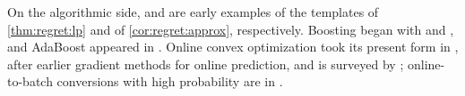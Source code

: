 \begin{refsection}
On the algorithmic side, \textcite{PlotkinShmoysTardos1995} and \textcite{GrigoriadisKhachiyan1995} are early examples of the templates of \cref{thm:regret:lp} and of \cref{cor:regret:approx}, respectively. Boosting began with \textcite{Schapire1990} and \textcite{Freund1995}, and AdaBoost appeared in \textcite{FreundSchapire1997}. Online convex optimization took its present form in \textcite{Zinkevich2003}, after earlier gradient methods for online prediction, and is surveyed by \textcite{Hazan2016}; online-to-batch conversions with high probability are in \textcite{CesaBianchiConconiGentile2004}.

\printchapterbib
\end{refsection}
